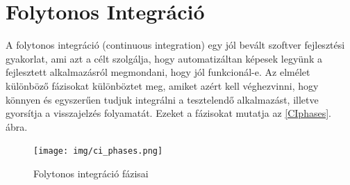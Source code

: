 \documentclass[11pt,magyar,a4paper,twoside,]{report}
\begin{document}
\section{Folytonos Integráció}\label{folytonos-integruxe1ciuxf3}

A folytonos integráció\citep{continuous-integration} (continuous
integration) egy jól bevált szoftver fejlesztési gyakorlat, ami azt a
célt szolgálja, hogy automatizáltan képesek legyünk a fejlesztett
alkalmazásról megmondani, hogy jól funkcionál-e. Az elmélet különböző
fázisokat különböztet meg, amiket azért kell véghezvinni, hogy könnyen
és egyszerűen tudjuk integrálni a tesztelendő alkalmazást, illetve
gyorsítja a visszajelzés folyamatát. Ezeket a fázisokat mutatja az
\ref{CIphases}. ábra.

\begin{figure}[H]
\centering
\texttt{[image: img/ci\_phases.png]}
\caption{Folytonos integráció fázisai}
\end{figure}
\end{document}
